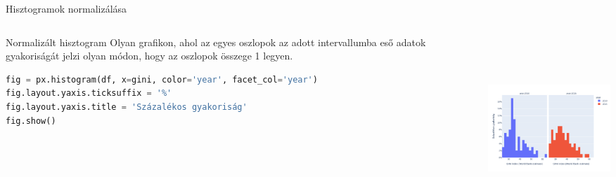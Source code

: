 \documentclass[english, aspectratio=169]{beamer}
\begin{document}
	\begin{frame}[fragile]{Hisztogramok normalizálása}
		\begin{columns}
			\begin{column}{.5\textwidth}
				\begin{block}{Normalizált hisztogram}
					Olyan grafikon, ahol az egyes oszlopok az adott intervallumba eső adatok gyakoriságát jelzi olyan módon, hogy az oszlopok összege 1 legyen. 
				\end{block}
				\begin{lstlisting}[language=python]
fig = px.histogram(df, x=gini, color='year', facet_col='year')
fig.layout.yaxis.ticksuffix = '%'
fig.layout.yaxis.title = 'Százalékos gyakoriság'
fig.show()
				\end{lstlisting}
			\end{column}
			\begin{column}{.5\textwidth}
				\begin{center}
					\includegraphics[width=7cm, height=7cm, keepaspectratio]{images/freq_8.png}
				\end{center}
			\end{column}
		\end{columns}
	\end{frame}
	
\end{document}
